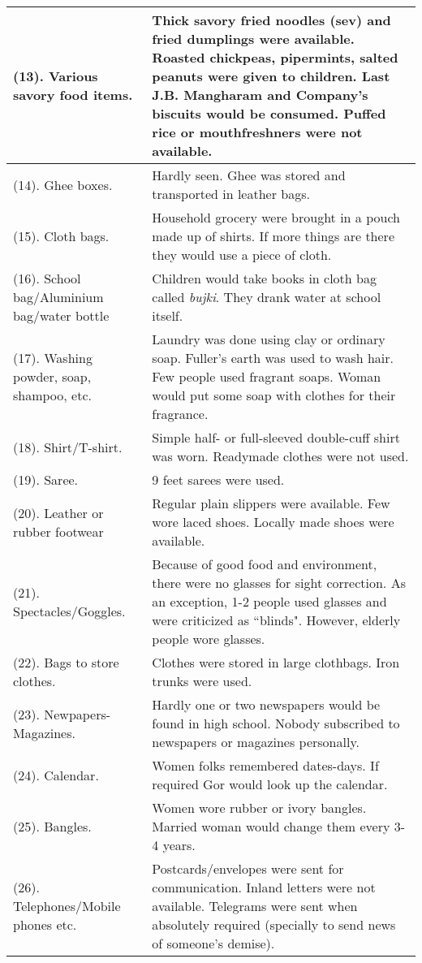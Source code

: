 \begin{center}
\begin{longtable}{p{5cm}|p{10cm}}
\hline
(13). Various savory food items. &
Thick savory fried noodles (sev) and fried dumplings were available. Roasted chickpeas, pipermints, salted peanuts were given to children. Last J.B. Mangharam and Company's biscuits would be consumed. Puffed rice or mouthfreshners were not available.\\
\hline
(14). Ghee boxes. &
Hardly seen. Ghee was stored and transported in leather bags.\\
\hline
(15). Cloth bags. & 
Household grocery were brought in a pouch made up of shirts. If more things are there they would use a piece of cloth. \\
\hline
(16). School bag/Aluminium bag/water bottle &
Children would take books in cloth bag called \textit{bujki}. They drank water at school itself.\\
\hline
(17). Washing powder, soap, shampoo, etc. &
Laundry was done using clay or ordinary soap. Fuller's earth was used to wash hair. Few people used fragrant soaps. Woman would put some soap with clothes for their fragrance.\\
\hline
(18). Shirt/T-shirt. &
Simple half- or full-sleeved double-cuff shirt was worn. Readymade clothes were not used.\\ 
\hline
(19). Saree. &
9 feet sarees were used. \\
\hline
(20). Leather or rubber footwear &
Regular plain slippers were available. Few wore laced shoes. Locally made shoes were available. \\
\hline
(21). Spectacles/Goggles. &
Because of good food and environment, there were no glasses for sight correction. As an exception, 1-2 people used glasses and were criticized as ``blinds". However, elderly people wore glasses.\\
\hline
(22). Bags to store clothes. &
Clothes were stored in large clothbags. Iron trunks were used. \\
\hline
(23). Newpapers-Magazines. &
Hardly one or two newspapers would be found in high school. Nobody subscribed to newspapers or magazines personally.\\
\hline
(24). Calendar. &
Women folks remembered dates-days. If required Gor would look up the calendar.\\
\hline
(25). Bangles. &
Women wore rubber or ivory bangles. Married woman would change them every 3-4 years. \\
\hline
(26). Telephones/Mobile phones etc. &
Postcards/envelopes were sent for communication. Inland letters were not available. Telegrams were sent when absolutely required (specially to send news of someone's demise).\\

\end{longtable}
\end{center}
